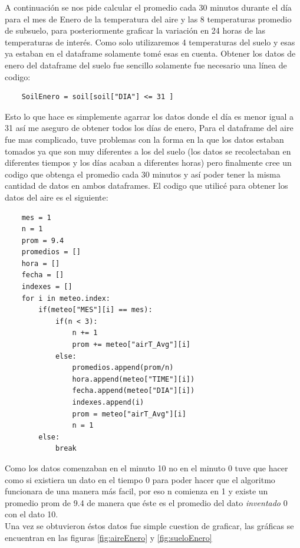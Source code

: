\documentclass[12pt]{article}
\begin{document}
A continuaci\'on se nos pide calcular el promedio cada 30 minutos durante el día para el mes de Enero de la temperatura del aire y las 8 temperaturas promedio de subsuelo, para posteriormente graficar la variación en 24 horas de las temperaturas de interés. Como solo utilizaremos 4 temperaturas del suelo y esas ya estaban en el dataframe solamente tom\'e esas en cuenta.
Obtener los datos de enero del dataframe del suelo fue sencillo solamente fue necesario una l\'inea de codigo:
\begin{verbatim}
    SoilEnero = soil[soil["DIA"] <= 31 ]
\end{verbatim}
Esto lo que hace es simplemente agarrar los datos donde el d\'ia es menor igual a 31 as\'i me aseguro de obtener todos los d\'ias de enero, Para el dataframe del aire fue mas complicado, tuve problemas con la forma en la que los datos estaban tomados ya que son muy diferentes a los del suelo (los datos se recolectaban en diferentes tiempos y los d\'ias acaban a diferentes horas) pero finalmente cree un codigo que obtenga el promedio cada 30 minutos y as\'i poder tener la misma cantidad de datos en ambos dataframes.
El codigo que utilic\'e para obtener los datos del aire es el siguiente:
\begin{verbatim}
    mes = 1
    n = 1
    prom = 9.4
    promedios = []
    hora = []
    fecha = []
    indexes = []
    for i in meteo.index:
        if(meteo["MES"][i] == mes): 
            if(n < 3):
                n += 1
                prom += meteo["airT_Avg"][i]
            else:
                promedios.append(prom/n)
                hora.append(meteo["TIME"][i])
                fecha.append(meteo["DIA"][i])
                indexes.append(i)
                prom = meteo["airT_Avg"][i]
                n = 1
        else:
            break
\end{verbatim}
Como los datos comenzaban en el minuto 10 no en el minuto 0 tuve que hacer como si existiera un dato en el tiempo 0 para poder hacer que el algoritmo funcionara de una manera m\'as facil, por eso n comienza en 1 y existe un promedio prom de 9.4 de manera que \'este es el promedio del dato \textit{inventado} 0 con el dato 10.\\
Una vez se obtuvieron \'estos datos fue simple cuestion de graficar, las gr\'aficas se encuentran en las figuras \ref{fig:aireEnero} y \ref{fig:sueloEnero}
\end{document}
